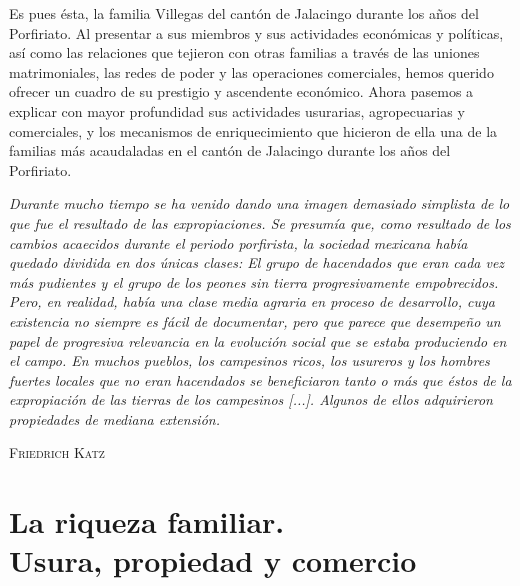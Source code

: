 \documentclass[14pt,twoside,final]{extbook} %
\begin{document}
Es pues ésta, la familia Villegas del cantón de Jalacingo durante los años del Porfiriato. Al presentar a sus miembros y sus actividades económicas y políticas, así como las relaciones que tejieron con otras familias a través de las uniones matrimoniales, las redes de poder y las operaciones comerciales, hemos querido ofrecer un cuadro de su prestigio y ascendente económico. Ahora pasemos a explicar con mayor profundidad sus actividades usurarias, agropecuarias y comerciales, y los mecanismos de enriquecimiento que hicieron de ella una de la familias más acaudaladas en el cantón de Jalacingo durante los años del Porfiriato.
\newpage
\pagestyle{empty}
\begin{flushright}
\begin{minipage}{8cm}
\emph{Durante mucho tiempo se ha venido dando una imagen demasiado simplista de lo que fue el resultado de las expropiaciones. Se presumía que, como resultado de los cambios acaecidos durante el
periodo porfirista, la sociedad mexicana había quedado dividida en dos únicas clases: El grupo de hacendados que eran cada vez más pudientes y el grupo de los peones sin tierra progresivamente empobrecidos. Pero, en realidad, había una clase media agraria en proceso de desarrollo, cuya existencia no siempre es fácil de documentar, pero que parece que desempeño un papel de progresiva relevancia en la evolución social que se estaba produciendo en el campo. En muchos pueblos, los campesinos ricos, los usureros y los hombres fuertes locales que no eran hacendados se beneficiaron tanto o más que éstos de la expropiación de las tierras de los campesinos [...]. Algunos de ellos adquirieron propiedades de mediana extensión.}
\end{minipage}
\end{flushright}
\begin{flushright}
\textsc{Friedrich Katz}
\end{flushright}
\chapter[La riqueza familiar. Usura, propiedad y comercio]{La riqueza familiar. \\ Usura, propiedad y comercio}
\label{ch:capitulo-tres}
\thispagestyle{empty}
\pagestyle{fancy}
\fancyhf{} %
\fancyhead[RO,LE]{\iffloatpage{}{\thepage}}
\renewcommand\headrulewidth{\iffloatpage{0pt}{0pt}}
\end{document}
